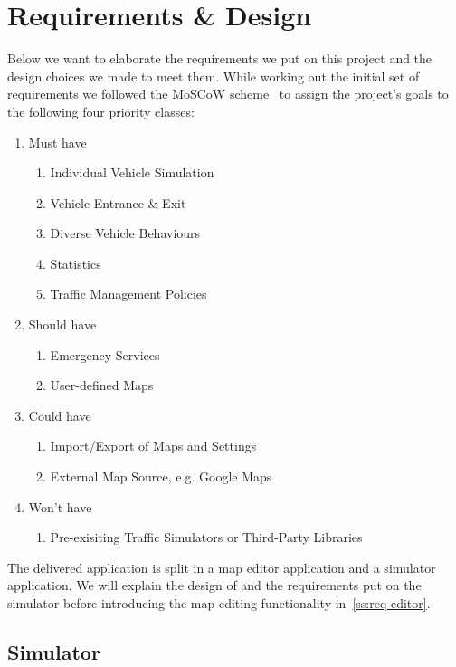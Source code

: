 \section{Requirements \& Design}\label{sec:reqs}
Below we want to elaborate the requirements we put on this project and the design choices we made to meet them. While working out the initial set of requirements we followed the MoSCoW scheme~\cite{brennan2009} to assign the project's goals to the following four priority classes:
\begin{enumerate} \itemsep1pt \parskip0pt 
	\item{Must have}
		\begin{enumerate} \itemsep1pt \parskip0pt 
			\item{Individual Vehicle Simulation}
			\item{Vehicle Entrance \& Exit}
			\item{Diverse Vehicle Behaviours}
			\item{Statistics}
			\item{Traffic Management Policies}
		\end{enumerate}
	\item{Should have}
		\begin{enumerate} \itemsep1pt \parskip0pt 
			\item{Emergency Services}
			\item{User-defined Maps}
		\end{enumerate}
	\item{Could have}
		\begin{enumerate} \itemsep1pt \parskip0pt 
			\item{Import/Export of Maps and Settings}
			\item{External Map Source, e.g. Google Maps}
		\end{enumerate}
	\item{Won't have}
		\begin{enumerate} \itemsep1pt \parskip0pt 
			\item{Pre-exisiting Traffic Simulators or Third-Party Libraries}
		\end{enumerate}
\end{enumerate}

The delivered application is split in a map editor application and a simulator application. We will explain the design of and the requirements put on the simulator before introducing the map editing functionality in~\ref{ss:req-editor}.

\subsection{Simulator}
